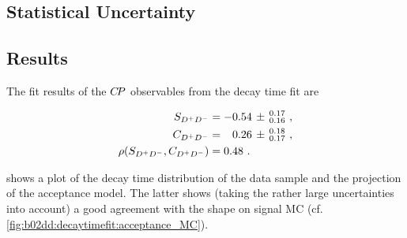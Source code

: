 \subsection{Statistical Uncertainty}
\label{sec:decaytimefit:uncertainty}


\subsection{Results}

The fit results of the ${C\!P}$ observables from the decay time fit are

\begin{align}
\begin{split}
  S_{{{D}^+}{{D}^-}}                &= -0.54\,\pm\,^{0.17}_{0.16} \ , \\
  C_{{{D}^+}{{D}^-}}                &= \phantom{-}0.26\,\pm\,^{0.18}_{0.17} \ , \\
  \rho(S_{{{D}^+}{{D}^-}},C_{{{D}^+}{{D}^-}})     &= 0.48 \ . \\
\end{split}
\label{eq:b02dd:decaytimefit:cpresults}
\end{align}

 shows a plot of the decay time distribution of the
\BdToDD data sample and the projection of the acceptance model. The latter
shows (taking the rather large uncertainties into account) a good agreement
with the shape on signal MC (cf. \cref{fig:b02dd:decaytimefit:acceptance_MC}).

